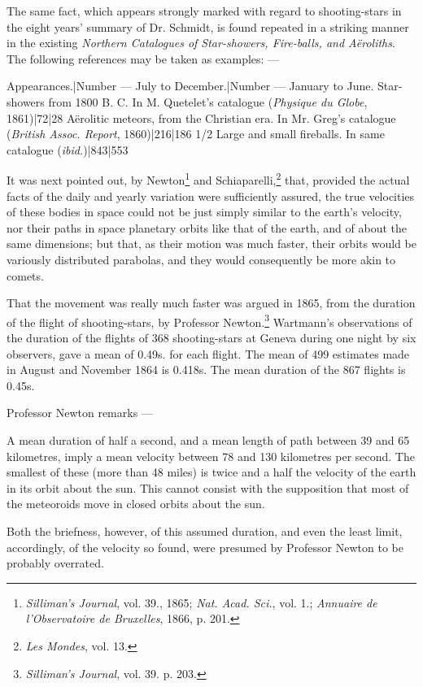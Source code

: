 \documentclass[a4paper, 12pt, oneside, polutonikogreek, english]{article}
\begin{document}
The same fact, which appears strongly marked with regard to shooting-stars in the eight years' summary of Dr. Schmidt, is found repeated in a striking manner in the existing \emph{Northern Catalogues of Star-showers, Fire-balls, and Aëroliths}. The following references may be taken as examples: ---

Appearances.|Number --- July to December.|Number --- January to June. 
Star-showers from 1800 B. C. In M. Quetelet's catalogue (\emph{Physique du Globe}, 1861)|72|28 
Aërolitic meteors, from the Christian era. In Mr. Greg's catalogue (\emph{British Assoc. Report}, 1860)|216|186 1/2 
Large and small fireballs. In same catalogue (\emph{ibid.})|843|553

It was next pointed out, by Newton\footnote{\emph{Silliman's Journal}, vol. 39., 1865; \emph{Nat. Acad. Sci.}, vol. 1.; \emph{Annuaire de l'Observatoire de Bruxelles}, 1866, p. 201.} and Schiaparelli,\footnote{\emph{Les Mondes}, vol. 13.} that, provided the actual facts of the daily and yearly variation were sufficiently assured, the true velocities of these bodies in space could not be just simply similar to the earth's velocity, nor their paths in space planetary orbits like that of the earth, and of about the same dimensions; but that, as their motion was much faster, their orbits would be variously distributed parabolas, and they would consequently be more akin to comets.

That the movement was really much faster was argued in 1865, from the duration of the flight of shooting-stars, by Professor Newton.\footnote{\emph{Silliman's Journal}, vol. 39. p. 203.} Wartmann's observations of the duration of the flights of 368 shooting-stars at Geneva during one night by six observers, gave a mean of 0.49s. for each flight. The mean of 499 estimates made in August and November 1864 is 0.418s. The mean duration of the 867 flights is 0.45s.

Professor Newton remarks ---

A mean duration of half a second, and a mean length of path between 39 and 65 kilometres, imply a mean velocity between 78 and 130 kilometres per second. The smallest of these (more than 48 miles) is twice and a half the velocity of the earth in its orbit about the sun. This cannot consist with the supposition that most of the meteoroids move in closed orbits about the sun.

Both the briefness, however, of this assumed duration, and even the least limit, accordingly, of the velocity so found, were presumed by Professor Newton to be probably overrated.
\end{document}
